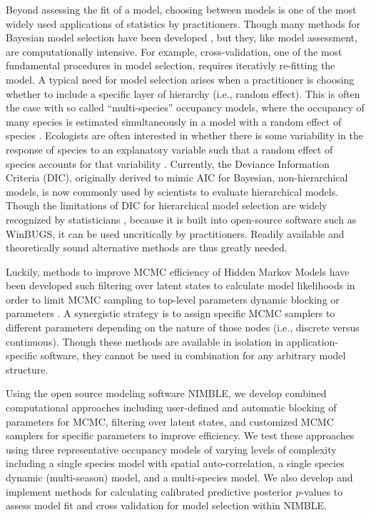 \documentclass[12pt]{article}
\begin{document}
Beyond assessing the fit of a model, choosing between models is one of
the most widely used applications of statistics by
practitioners. Though many methods for Bayesian model selection have
been developed \citep{hooten2014guide}, but they, like model
assessment, are computationally intensive. For example,
cross-validation, one of the most fundamental procedures in model
selection, requires iterativly re-fitting the model. A typical need
for model selection arises when a practitioner is choosing whether to
include a specific layer of hierarchy (i.e., random effect). This is
often the case with so called ``multi-species'' occupancy models,
where the occupancy of many species is estimated simultaneously in a
model with a random effect of species \citep[reviewed in,
][]{iknayan2014detecting}. Ecologists are often interested in whether
there is some variability in the response of species to an explanatory
variable such that a random effect of species accounts for that
variability \citep{pacifici2014guidelines}. Currently, the Deviance
Information Criteria (DIC), originally derived to mimic AIC for
Bayesian, non-hierarchical models, is now commonly used by scientists
to evaluate hierarchical models. Though the limitations of DIC for
hierarchical model selection are widely recognized by statisticians
\citep{celeux2006deviance, hooten2014guide}, because it is built into
open-source software such as WinBUGS, it can be used uncritically by
practitioners. Readily available and theoretically sound alternative
methods are thus greatly needed.

Luckily, methods to improve MCMC efficiency of Hidden Markov Models
have been developed such filtering over latent states to calculate
model likelihoods in order to limit MCMC sampling to top-level
parameters dynamic blocking or parameters
\citep{turek2016efficient}. A synergistic strategy is to assign
specific MCMC samplers to different parameters depending on the nature
of those nodes (i.e., discrete versus continuous). Though these
methods are available in isolation in application-specific software,
they cannot be used in combination for any arbitrary model structure.

Using the open source modeling software NIMBLE, we develop combined
computational approaches including user-defined and automatic blocking
of parameters for MCMC, filtering over latent states, and customized
MCMC samplers for specific parameters to improve efficiency. We test
these approaches using three representative occupancy models of
varying levels of complexity including a single species model with
spatial auto-correlation, a single species dynamic (multi-season)
model, and a multi-species model. We also develop and implement
methods for calculating calibrated predictive posterior $p$-values to
assess model fit and cross validation for model selection within
NIMBLE. 
\end{document}
